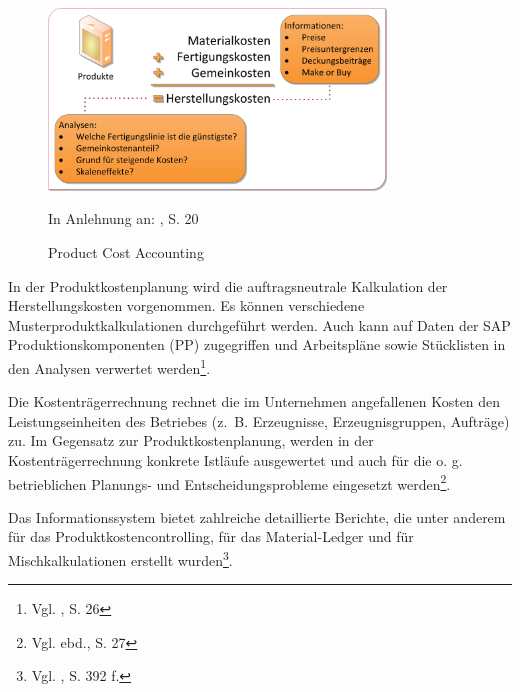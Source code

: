 \begin{figure}[htbp]
\begin{center}
\includegraphics[width=0.8\textwidth]{Images/produktkosten.png}

   {\footnotesize In Anlehnung an: \cite{SAPCOPCPCP2001}, S. 20}
   \caption[Product Cost Accounting]{Product Cost Accounting}\label{abb3}
\end{center}
\end{figure}\noindent
In der Produktkostenplanung wird die auftragsneutrale Kalkulation der Herstellungskosten vorgenommen. Es können verschiedene Musterproduktkalkulationen durchgeführt werden. Auch kann auf Daten der SAP Produktionskomponenten (PP) zugegriffen und Arbeitspläne sowie Stücklisten in den Analysen verwertet werden\footnote{Vgl. \cite{Friedl2008}, S. 26}.

Die Kostenträgerrechnung rechnet die im Unternehmen angefallenen Kosten den Leistungseinheiten des Betriebes (z.~B. Erzeugnisse, Erzeugnisgruppen, Aufträge) zu. Im Gegensatz zur Produktkostenplanung, werden in der Kostenträgerrechnung konkrete Istläufe ausgewertet und auch für die o. g. betrieblichen Planungs- und Entscheidungsprobleme eingesetzt werden\footnote{Vgl. ebd., S. 27}.

Das Informationssystem bietet zahlreiche detaillierte Berichte, die unter anderem für das Produktkostencontrolling, für das Material-Ledger und für Mischkalkulationen erstellt wurden\footnote{Vgl. \cite{Patel2009}, S. 392 f.}.



